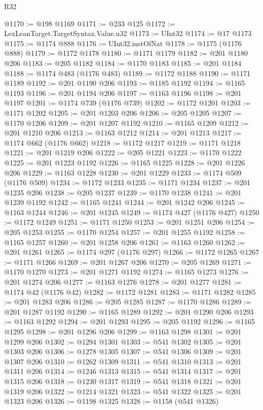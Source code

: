 \begin{lexlean}{R32}
\begin{coremodule}
@1170 := @198 @1169
@1171 := @233 @125
@1172 := LexLeanTarget.TargetSyntax.Value.u32
@1173 := UInt32
@1174 := @17 @1173
@1175 := @1174 @888
@1176 := UInt32.instOfNat
@1178 := @1175 (@1176 @888)
@1179 := @1172 @1178
@1180 := @1171 @1179
@1182 := @201 @1180 @206
@1183 := @205 @1182
@1184 := @1170 @1183
@1185 := @201 @1184
@1188 := @1174 @483 (@1176 @483)
@1189 := @1172 @1188
@1190 := @1171 @1189
@1192 := @201 @1190 @206
@1193 := @1185 @1192
@1194 := @1165 @1193
@1196 := @201 @1194 @206
@1197 := @1163 @1196
@1198 := @201 @1197
@1201 := @1174 @739 (@1176 @739)
@1202 := @1172 @1201
@1203 := @1171 @1202
@1205 := @201 @1203 @206
@1206 := @205 @1205
@1207 := @1170 @1206
@1209 := @201 @1207 @1192
@1210 := @1165 @1209
@1212 := @201 @1210 @206
@1213 := @1163 @1212
@1214 := @201 @1213
@1217 := @1174 @662 (@1176 @662)
@1218 := @1172 @1217
@1219 := @1171 @1218
@1221 := @201 @1219 @206
@1222 := @205 @1221
@1223 := @1170 @1222
@1225 := @201 @1223 @1192
@1226 := @1165 @1225
@1228 := @201 @1226 @206
@1229 := @1163 @1228
@1230 := @201 @1229
@1233 := @1174 @509 (@1176 @509)
@1234 := @1172 @1233
@1235 := @1171 @1234
@1237 := @201 @1235 @206
@1238 := @205 @1237
@1239 := @1170 @1238
@1241 := @201 @1239 @1192
@1242 := @1165 @1241
@1244 := @201 @1242 @206
@1245 := @1163 @1244
@1246 := @201 @1245
@1249 := @1174 @427 (@1176 @427)
@1250 := @1172 @1249
@1251 := @1171 @1250
@1253 := @201 @1251 @206
@1254 := @205 @1253
@1255 := @1170 @1254
@1257 := @201 @1255 @1192
@1258 := @1165 @1257
@1260 := @201 @1258 @206
@1261 := @1163 @1260
@1262 := @201 @1261
@1265 := @1174 @297 (@1176 @297)
@1266 := @1172 @1265
@1267 := @1171 @1266
@1269 := @201 @1267 @206
@1270 := @205 @1269
@1271 := @1170 @1270
@1273 := @201 @1271 @1192
@1274 := @1165 @1273
@1276 := @201 @1274 @206
@1277 := @1163 @1276
@1278 := @201 @1277
@1281 := @1174 @42 (@1176 @42)
@1282 := @1172 @1281
@1283 := @1171 @1282
@1285 := @201 @1283 @206
@1286 := @205 @1285
@1287 := @1170 @1286
@1289 := @201 @1287 @1192
@1290 := @1165 @1289
@1292 := @201 @1290 @206
@1293 := @1163 @1292
@1294 := @201 @1293
@1295 := @205 @1192
@1296 := @1165 @1295
@1298 := @201 @1296 @206
@1299 := @1163 @1298
@1301 := @201 @1299 @206
@1302 := @1294 @1301
@1303 := @541 @1302
@1305 := @201 @1303 @206
@1306 := @1278 @1305
@1307 := @541 @1306
@1309 := @201 @1307 @206
@1310 := @1262 @1309
@1311 := @541 @1310
@1313 := @201 @1311 @206
@1314 := @1246 @1313
@1315 := @541 @1314
@1317 := @201 @1315 @206
@1318 := @1230 @1317
@1319 := @541 @1318
@1321 := @201 @1319 @206
@1322 := @1214 @1321
@1323 := @541 @1322
@1325 := @201 @1323 @206
@1326 := @1198 @1325
@1328 := @1158 (@541 @1326)

\end{coremodule}
\end{lexlean}

